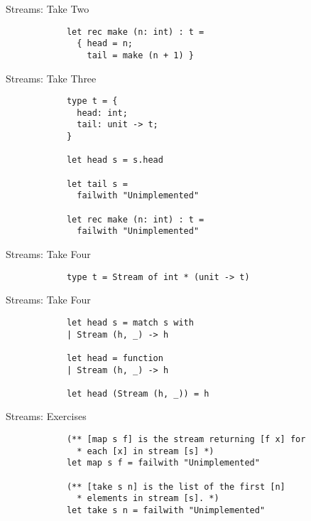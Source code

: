 \documentclass{beamer}
\begin{document}
    \begin{frame}[fragile=singleslide]{Streams: Take Two}
        \begin{verbatim}
            let rec make (n: int) : t =
              { head = n;
                tail = make (n + 1) }
        \end{verbatim}
    \end{frame}

    \begin{frame}[fragile=singleslide]{Streams: Take Three}
        \begin{verbatim}
            type t = {
              head: int;
              tail: unit -> t;
            }

            let head s = s.head

            let tail s =
              failwith "Unimplemented"

            let rec make (n: int) : t =
              failwith "Unimplemented"
        \end{verbatim}
    \end{frame}

    \begin{frame}[fragile=singleslide]{Streams: Take Four}
        \begin{verbatim}
            type t = Stream of int * (unit -> t)
        \end{verbatim}
    \end{frame}

    \begin{frame}[fragile=singleslide]{Streams: Take Four}
        \begin{verbatim}
            let head s = match s with
            | Stream (h, _) -> h

            let head = function
            | Stream (h, _) -> h

            let head (Stream (h, _)) = h
        \end{verbatim}
    \end{frame}

    \begin{frame}[fragile=singleslide]{Streams: Exercises}
        \begin{verbatim}
            (** [map s f] is the stream returning [f x] for
              * each [x] in stream [s] *)
            let map s f = failwith "Unimplemented"

            (** [take s n] is the list of the first [n]
              * elements in stream [s]. *)
            let take s n = failwith "Unimplemented"
        \end{verbatim}
    \end{frame}
\end{document}

